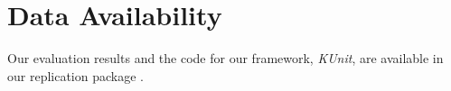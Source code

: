 \section[Data Availability]{Data Availability}
\label{sec:data-availability}
Our evaluation results and the code for our framework, \textit{KUnit}, are available in our replication package \cite{myRepo}.